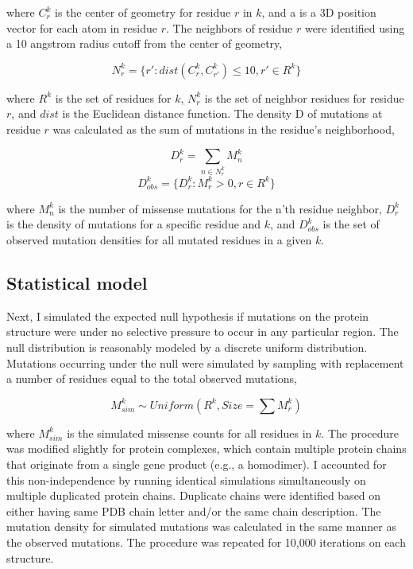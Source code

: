 where $C_r^k$ is the center of geometry for residue $r$ in $k$, and a is a 3D position vector for each atom in residue $r$. The neighbors of residue $r$ were identified using a 10 angstrom radius cutoff from the center of geometry,

\begin{equation}
N_r^k = \{r' : dist(C_r^k, C_{r'}^k) \leq 10, r' \in R^k \}
\end{equation}

where $R^k$ is the set of residues for $k$, $N_r^k$ is the set of neighbor residues for residue $r$, and $dist$ is the Euclidean distance function. The density D of mutations at residue $r$ was calculated as the sum of mutations in the residue's neighborhood,

\begin{equation}
D_r^k = \sum_{n \in N_r^k}{M^k_n}
\end{equation}
\begin{equation}
D^k_{obs} = \{D^k_r : M^k_r>0, r \in R^k\}
\end{equation}

where $M_n^k$ is the number of missense mutations for the n'th residue neighbor, $D_r^k$ is the density of mutations for a specific residue and $k$, and $D_{obs}^k$ is the set of observed mutation densities for all mutated residues in a given $k$.

\subsection{Statistical model}

Next, I simulated the expected null hypothesis if mutations on the protein structure were under no selective pressure to occur in any particular region.   The null distribution is reasonably modeled by a discrete uniform distribution. Mutations occurring under the null were simulated by sampling with replacement a number of residues equal to the total observed mutations,

\begin{equation}
M_{sim}^k \sim Uniform(R^k, Size=\sum{M_r^k})
\end{equation}

where $M_{sim}^k$ is the simulated missense counts for all residues in $k$.  The procedure was modified slightly for protein complexes, which contain multiple protein chains that originate from a single gene product (e.g., a homodimer). I accounted for this non-independence by running identical simulations simultaneously on multiple duplicated protein chains.  Duplicate chains were identified based on either having same PDB chain letter and/or the same chain description. The mutation density for simulated mutations was calculated in the same manner as the observed mutations. The procedure was repeated for 10,000 iterations on each structure.

